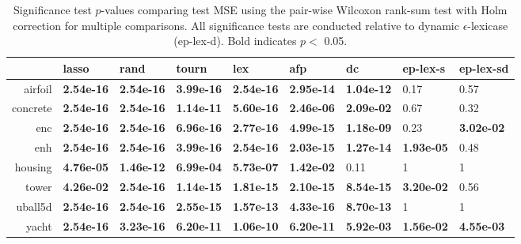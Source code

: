 \begin{table}[ht]
\centering
\caption{Significance test $p$-values comparing test MSE using the pair-wise Wilcoxon rank-sum test with Holm correction for multiple comparisons. All significance tests are conducted relative to dynamic $\epsilon$-lexicase (ep-lex-d). Bold indicates $p<$ 0.05.} 
\label{tbl:wilcox}
\begingroup\footnotesize
\begin{tabular}{rllllllll}
  \toprule
 & lasso & rand & tourn & lex & afp & dc & ep-lex-s & ep-lex-sd \\ 
  \midrule
airfoil & {\bf 2.54e-16} & {\bf 2.54e-16} & {\bf 3.99e-16} & {\bf 2.54e-16} & {\bf 2.95e-14} & {\bf 1.04e-12} & 0.17 & 0.57 \\ 
  concrete & {\bf 2.54e-16} & {\bf 2.54e-16} & {\bf 1.14e-11} & {\bf 5.60e-16} & {\bf 2.46e-06} & {\bf 2.09e-02} & 0.67 & 0.32 \\ 
  enc & {\bf 2.54e-16} & {\bf 2.54e-16} & {\bf 6.96e-16} & {\bf 2.77e-16} & {\bf 4.99e-15} & {\bf 1.18e-09} & 0.23 & {\bf 3.02e-02} \\ 
  enh & {\bf 2.54e-16} & {\bf 2.54e-16} & {\bf 3.99e-16} & {\bf 2.54e-16} & {\bf 2.03e-15} & {\bf 1.27e-14} & {\bf 1.93e-05} & 0.48 \\ 
  housing & {\bf 4.76e-05} & {\bf 1.46e-12} & {\bf 6.99e-04} & {\bf 5.73e-07} & {\bf 1.42e-02} & 0.11 &   1 &   1 \\ 
  tower & {\bf 4.26e-02} & {\bf 2.54e-16} & {\bf 1.14e-15} & {\bf 1.81e-15} & {\bf 2.10e-15} & {\bf 8.54e-15} & {\bf 3.20e-02} & 0.56 \\ 
  uball5d & {\bf 2.54e-16} & {\bf 2.54e-16} & {\bf 2.55e-15} & {\bf 1.57e-13} & {\bf 4.33e-16} & {\bf 8.70e-13} &   1 &   1 \\ 
  yacht & {\bf 2.54e-16} & {\bf 3.23e-16} & {\bf 6.20e-11} & {\bf 1.06e-10} & {\bf 6.20e-11} & {\bf 5.92e-03} & {\bf 1.56e-02} & {\bf 4.55e-03} \\ 
   \bottomrule
\end{tabular}
\endgroup
\end{table}
